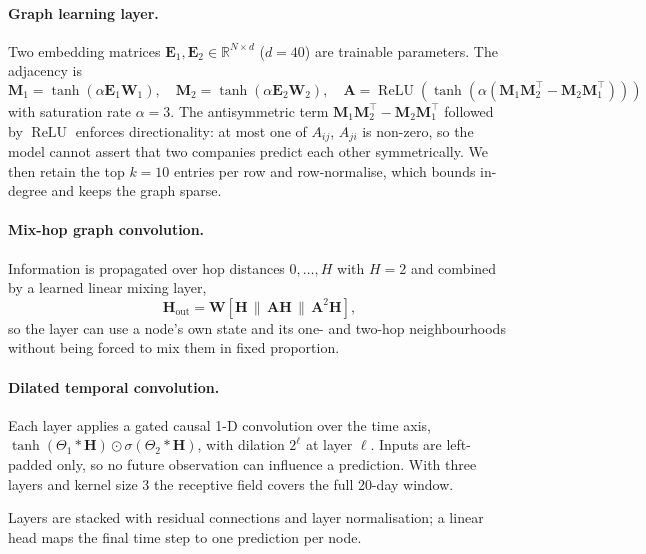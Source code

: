 \paragraph{Graph learning layer.} Two embedding matrices $\mathbf{E}_1, \mathbf{E}_2 \in \mathbb{R}^{N \times d}$ ($d = 40$) are trainable parameters. The adjacency is
\begin{equation}
\mathbf{M}_1 = \tanh(\alpha \mathbf{E}_1 \mathbf{W}_1), \quad
\mathbf{M}_2 = \tanh(\alpha \mathbf{E}_2 \mathbf{W}_2), \quad
\mathbf{A} = \operatorname{ReLU}\!\left(\tanh\!\left(\alpha\left(\mathbf{M}_1\mathbf{M}_2^{\top} - \mathbf{M}_2\mathbf{M}_1^{\top}\right)\right)\right)
\end{equation}
with saturation rate $\alpha = 3$. The antisymmetric term $\mathbf{M}_1\mathbf{M}_2^\top - \mathbf{M}_2\mathbf{M}_1^\top$ followed by $\operatorname{ReLU}$ enforces directionality: at most one of $A_{ij}$, $A_{ji}$ is non-zero, so the model cannot assert that two companies predict each other symmetrically. We then retain the top $k = 10$ entries per row and row-normalise, which bounds in-degree and keeps the graph sparse.

\paragraph{Mix-hop graph convolution.} Information is propagated over hop distances $0, \ldots, H$ with $H=2$ and combined by a learned linear mixing layer,
\begin{equation}
\mathbf{H}_{\text{out}} = \mathbf{W}\left[\mathbf{H} \,\|\, \mathbf{A}\mathbf{H} \,\|\, \mathbf{A}^{2}\mathbf{H}\right],
\end{equation}
so the layer can use a node's own state and its one- and two-hop neighbourhoods without being forced to mix them in fixed proportion.

\paragraph{Dilated temporal convolution.} Each layer applies a gated causal 1-D convolution over the time axis, $\tanh(\Theta_1 \ast \mathbf{H}) \odot \sigma(\Theta_2 \ast \mathbf{H})$, with dilation $2^{\ell}$ at layer $\ell$. Inputs are left-padded only, so no future observation can influence a prediction. With three layers and kernel size 3 the receptive field covers the full 20-day window.

Layers are stacked with residual connections and layer normalisation; a linear head maps the final time step to one prediction per node.

